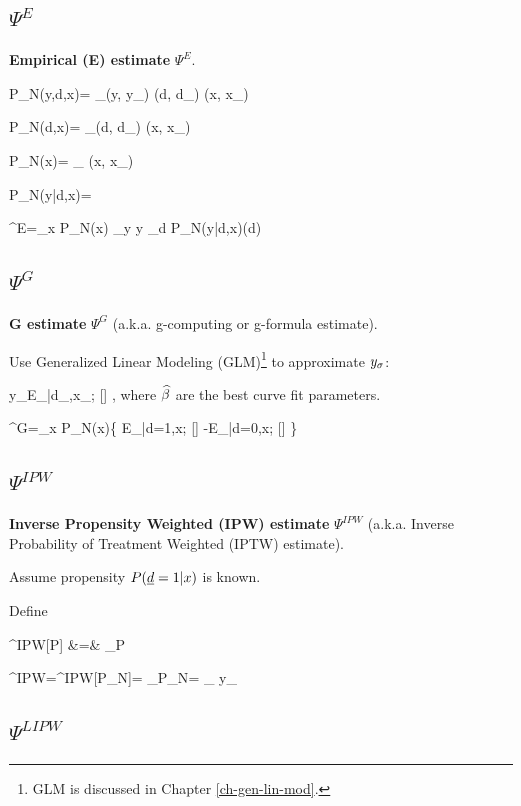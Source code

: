 \subsection{$\Psi^{E}$}

{\bf Empirical (E) estimate} $\Psi^E$.

\beq
P_N(y,d,x)= \sum_\s \delta(y, y_\s)
\delta(d, d_\s)
\delta(x, x_\s)
\eeq

\beq
P_N(d,x)= \sum_\s \delta(d, d_\s)
\delta(x, x_\s)
\eeq

\beq
P_N(x)= \sum_\s
\delta(x, x_\s)
\eeq

\beq
P_N(y|d,x)= 
\eeq


\beq
\Psi^{E}=\sum_x P_N(x)
\sum_y y \sum_d P_N(y|d,x)\Delta(d)
\eeq

\subsection{$\Psi^{G}$}

{\bf G estimate} $\Psi^G$
(a.k.a. g-computing or g-formula estimate).

Use Generalized 
Linear Modeling (GLM)\footnote{GLM
is discussed in Chapter \ref{ch-gen-lin-mod}.}
to approximate $y_\sigma$:

\beq
y_\s\approx E_{\rvy|d_\s,x_\s; \HAT{\beta}}[\rvy]
\;,
\eeq
where ${\widehat{\beta}}$ are the best curve fit parameters.

\beq
\Psi^{G}=\sum_x P_N(x)\{
E_{\rvy|d=1,x; \HAT{\beta}}[\rvy]
-E_{\rvy|d=0,x; \HAT{\beta}}[\rvy]
\}
\eeq

\subsection{$\Psi^{IPW}$}

{\bf Inverse Propensity Weighted (IPW) estimate} $\Psi^{IPW}$
(a.k.a. Inverse Probability of Treatment Weighted (IPTW) estimate).

Assume propensity $P({\underline{d}}=1|x)$ is known.

Define

\beqa
\Psi^{IPW}[P]
&=&
_P
\eeqa

\beq
\Psi^{IPW}=\Psi^{IPW}[P_N]=
_{P_N}=
\sum_\s
y_\s {}
\eeq


\subsection{$\Psi^{LIPW}$}

